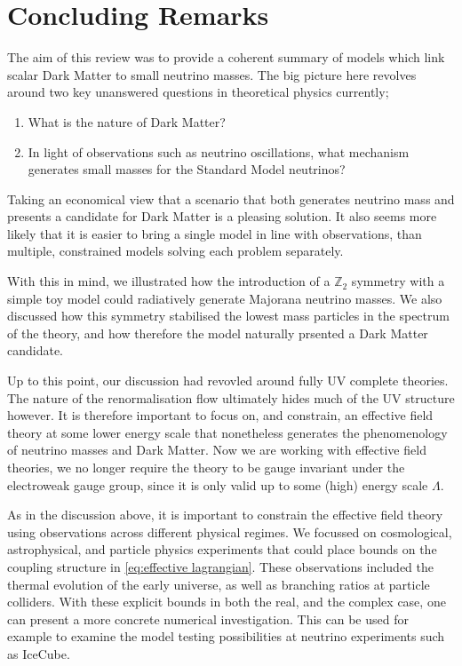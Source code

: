 \documentclass[10pt]{article}
\begin{document}
\section{Concluding Remarks}
The aim of this review was to provide a coherent summary of models which link scalar Dark Matter to small neutrino masses. The big picture here revolves around two key unanswered questions in theoretical physics currently;
\begin{enumerate}
  \item What is the nature of Dark Matter?
  \item In light of observations such as neutrino oscillations, what mechanism generates small masses for the Standard Model neutrinos?
\end{enumerate}
Taking an economical view that a scenario that both generates neutrino mass and presents a candidate for Dark Matter is a pleasing solution. It also seems more likely that it is easier to bring a single model in line with observations, than multiple, constrained models solving each problem separately.

With this in mind, we illustrated how the introduction of a $\mathbb{Z}_2$ symmetry with a simple toy model could radiatively generate Majorana neutrino masses. We also discussed how this symmetry stabilised the lowest mass particles in the spectrum of the theory, and how therefore the model naturally prsented a Dark Matter candidate.

Up to this point, our discussion had revovled around fully UV complete theories. The nature of the renormalisation flow ultimately hides much of the UV structure however. It is therefore important to focus on, and constrain, an effective field theory at some lower energy scale that nonetheless generates the phenomenology of neutrino masses and Dark Matter. Now we are working with effective field theories, we no longer require the theory to be gauge invariant under the electroweak gauge group, since it is only valid up to some (high) energy scale $\Lambda$.

As in the discussion above, it is important to constrain the effective field theory using observations across different physical regimes. We focussed on cosmological, astrophysical, and particle physics experiments that could place bounds on the coupling structure in \eqref{eq:effective lagrangian}. These observations included the thermal evolution of the early universe, as well as branching ratios at particle colliders. With these explicit bounds in both the real, and the complex case, one can present a more concrete numerical investigation. This can be used for example to examine the model testing possibilities at neutrino experiments such as IceCube.
\end{document}
